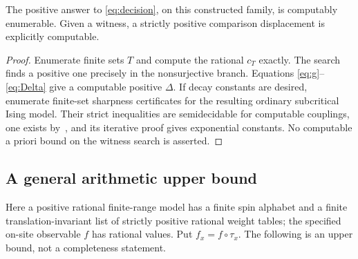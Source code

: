 \begin{corollary}\label{cor:semidecide}
The positive answer to \eqref{eq:decision}, on this constructed family, is computably enumerable. Given a witness, a strictly positive comparison displacement is explicitly computable.
\end{corollary}
\begin{proof}
Enumerate finite sets \(T\) and compute the rational \(c_T\) exactly. The search finds a positive one precisely in the nonsurjective branch. Equations \eqref{eq:g}--\eqref{eq:Delta} give a computable positive \(\Delta\). If decay constants are desired, enumerate finite-set sharpness certificates for the resulting ordinary subcritical Ising model. Their strict inequalities are semidecidable for computable couplings, one exists by~\cite{DCT}, and its iterative proof gives exponential constants. No computable a priori bound on the witness search is asserted.
\end{proof}

\subsection{A general arithmetic upper bound}
Here a positive rational finite-range model has a finite spin alphabet and a finite translation-invariant list of strictly positive rational weight tables; the specified on-site observable $f$ has rational values. Put $f_x=f\circ\tau_x$. The following is an upper bound, not a completeness statement.

